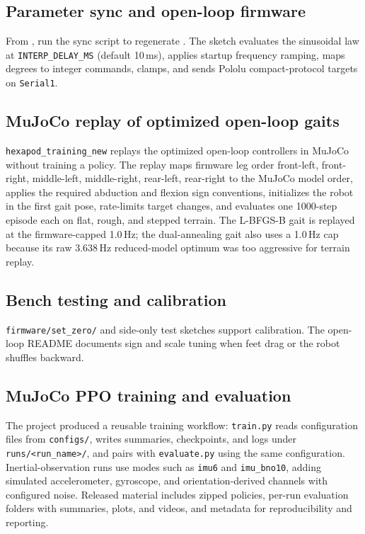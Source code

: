 \documentclass[11pt]{article}
\begin{document}
\subsection{Parameter sync and open-loop firmware}
From , run the sync script to regenerate . The sketch evaluates the sinusoidal law at \texttt{INTERP\_DELAY\_MS} (default 10\,ms), applies startup frequency ramping, maps degrees to integer commands, clamps, and sends Pololu compact-protocol targets on \texttt{Serial1}.

\subsection{MuJoCo replay of optimized open-loop gaits}
\texttt{hexapod\_training\_new} replays the optimized open-loop controllers in MuJoCo without training a policy. The replay maps firmware leg order front-left, front-right, middle-left, middle-right, rear-left, rear-right to the MuJoCo model order, applies the required abduction and flexion sign conventions, initializes the robot in the first gait pose, rate-limits target changes, and evaluates one 1000-step episode each on flat, rough, and stepped terrain. The L-BFGS-B gait is replayed at the firmware-capped 1.0\,Hz; the dual-annealing gait also uses a 1.0\,Hz cap because its raw 3.638\,Hz reduced-model optimum was too aggressive for terrain replay.

\subsection{Bench testing and calibration}
\texttt{firmware/set\_zero/} and side-only test sketches support calibration. The open-loop README documents sign and scale tuning when feet drag or the robot shuffles backward.

\subsection{MuJoCo PPO training and evaluation}
The project produced a reusable training workflow: \texttt{train.py} reads configuration files from \texttt{configs/}, writes summaries, checkpoints, and logs under \texttt{runs/<run\_name>/}, and pairs with \texttt{evaluate.py} using the same configuration. Inertial-observation runs use modes such as \texttt{imu6} and \texttt{imu\_bno10}, adding simulated accelerometer, gyroscope, and orientation-derived channels with configured noise. Released material includes zipped policies, per-run evaluation folders with summaries, plots, and videos, and metadata for reproducibility and reporting.
\end{document}
